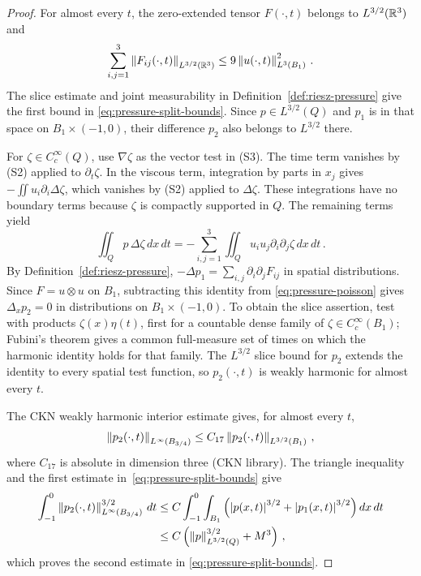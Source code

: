 \documentclass[11pt,letterpaper]{article}
\numberwithin{equation}{section}
\theoremstyle{plain}
\theoremstyle{definition}
\theoremstyle{remark}
\begin{document}
\begin{proof}
For almost every $t$, the zero-extended tensor $F(\cdot,t)$ belongs to $L^{3/2}(\mathbb{R}^3)$ and
\begin{equation}\label{eq:pressure-split-cz}
\sum_{i,j=1}^3\left\lVert F_{ij}(\cdot,t)\right\rVert_{L^{3/2}(\mathbb{R}^3)}
\le 9\left\lVert u(\cdot,t)\right\rVert_{L^3(B_1)}^2\,.
\end{equation}
The slice estimate and joint measurability in Definition~\ref{def:riesz-pressure} give the first bound in \eqref{eq:pressure-split-bounds}. Since $p\in L^{3/2}(Q)$ and $p_1$ is in that space on $B_1\times(-1,0)$, their difference $p_2$ also belongs to $L^{3/2}$ there.

For $\zeta\in C_c^\infty(Q)$, use $\nabla\zeta$ as the vector test in (S3). The time term vanishes by (S2) applied to $\partial_t\zeta$. In the viscous term, integration by parts in $x_j$ gives $-\iint u_i\partial_i\Delta\zeta$, which vanishes by (S2) applied to $\Delta\zeta$. These integrations have no boundary terms because $\zeta$ is compactly supported in $Q$. The remaining terms yield
\begin{equation}\label{eq:pressure-poisson}
\iint_Q p\,\Delta\zeta\,dx\,dt
=-\sum_{i,j=1}^3\iint_Q u_i u_j\partial_i\partial_j\zeta\,dx\,dt\,.
\end{equation}
By Definition~\ref{def:riesz-pressure}, $-\Delta p_1=\sum_{i,j}\partial_i\partial_jF_{ij}$ in spatial distributions. Since $F=u\otimes u$ on $B_1$, subtracting this identity from \eqref{eq:pressure-poisson} gives $\Delta_xp_2=0$ in distributions on $B_1\times(-1,0)$. To obtain the slice assertion, test with products $\zeta(x)\eta(t)$, first for a countable dense family of $\zeta\in C_c^\infty(B_1)$; Fubini's theorem gives a common full-measure set of times on which the harmonic identity holds for that family. The $L^{3/2}$ slice bound for $p_2$ extends the identity to every spatial test function, so $p_2(\cdot,t)$ is weakly harmonic for almost every $t$.

The CKN weakly harmonic interior estimate gives, for almost every $t$,
\begin{equation}\label{eq:pressure-harmonic-sup}
\left\lVert p_2(\cdot,t)\right\rVert_{L^\infty(B_{3/4})}
\le C_{17}\left\lVert p_2(\cdot,t)\right\rVert_{L^{3/2}(B_1)}\,,
\end{equation}
where $C_{17}$ is absolute in dimension three (CKN library). The triangle inequality and the first estimate in~\eqref{eq:pressure-split-bounds} give
\begin{align*}
\int_{-1}^0\left\lVert p_2(\cdot,t)\right\rVert_{L^\infty(B_{3/4})}^{3/2}\,dt
&\le C\int_{-1}^0\int_{B_1}\left(\left\lvert p(x,t)\right\rvert^{3/2}+\left\lvert p_1(x,t)\right\rvert^{3/2}\right)dx\,dt\\
&\le C\left(\left\lVert p\right\rVert_{L^{3/2}(Q)}^{3/2}+M^3\right)\,,
\end{align*}
which proves the second estimate in \eqref{eq:pressure-split-bounds}.


\end{proof}
\end{document}

